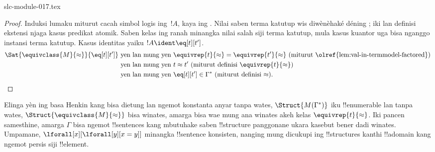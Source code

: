 \begin{filecontents*}[overwrite]{slc-module-017.tex}
\begin{proof}
Induksi lumaku miturut cacah simbol logis ing~$!A$, kaya ing
. Nilai saben terma katutup wis diwènèhaké déning
; iki lan definisi ekstensi
njaga kasus predikat atomik. Saben kelas ing ranah minangka nilai salah siji terma katutup,
mula kasus kuantor uga bisa nganggo instansi terma katutup.
Kasus identitas yaiku $!A \ident \eq[t][t']$.
\begin{align*}
\Sat{\equivclass{M}{\approx}}{\eq[t][t']} & \text{ yen lan mung yen } \equivrep{t}{\approx} = \equivrep{t'}{\approx}
\text{ (miturut \olref{lem:val-in-termmodel-factored})}\\
& \text{ yen lan mung yen } t \approx t' \text{ (miturut definisi $\equivrep{t}{\approx}$)}\\
& \text{ yen lan mung yen } \eq[t][t'] \in \Gamma^* \text{ (miturut definisi $\approx$).}
\end{align*}
\end{proof}

\begin{digress}
Elinga yèn ing basa Henkin kang bisa dietung lan ngemot konstanta anyar tanpa wates,
$\Struct{M(\Gamma^*)}$ iku !!{enumerable} lan
tanpa wates, $\Struct{\equivclass{M}{\approx}}$ bisa winates, amarga
bisa wae mung ana winates akeh kelas $\equivrep{t}{\approx}$. Iki
pancen samesthine, amarga $\Gamma$ bisa ngemot !!{sentence}s kang
mbutuhake saben !!{structure} panggonane ukara kasebut bener dadi
winates. Umpamane, $\lforall[x][\lforall[y][x = y]]$ minangka
!!{sentence} konsisten, nanging mung dicukupi ing !!{structure}s kanthi
!!a{domain} kang ngemot persis siji !!{element}.
\end{digress}


\end{filecontents*}


